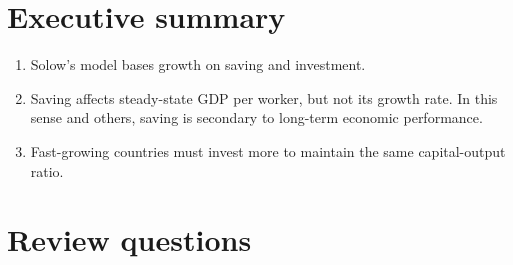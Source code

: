 



\section*{Executive summary}

\setlength{\leftmargini}{.5\oldleftmargini}
\begin{enumerate}
\item Solow's model bases growth on saving and investment.

\item Saving affects steady-state GDP per worker,
but not its growth rate.
In this sense and others, saving is secondary to long-term
economic performance.

\item
Fast-growing countries must invest more to maintain the same
capital-output ratio.
\end{enumerate}
\setlength{\leftmargini}{\oldleftmargini}

\section*{Review questions}

